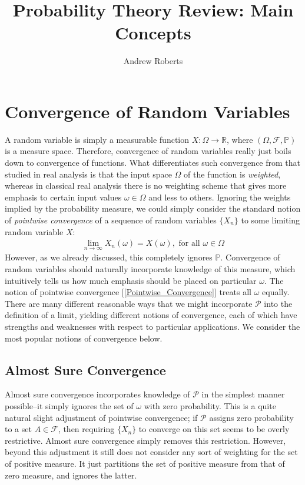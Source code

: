 \documentclass[12pt]{article}
\title{Probability Theory Review: Main Concepts}
\author{Andrew Roberts}
\newcommand{\R}{\mathbb{R}}
\begin{document}
\maketitle
\tableofcontents
\newpage

\section{Convergence of Random Variables}
A random variable is simply a measurable function $X: \Omega \to \R$, where $(\Omega, \mathcal{F}, \mathbb{P})$ is a measure space. Therefore, convergence of random variables
really just boils down to convergence of functions. What differentiates such convergence from that studied in real analysis is that the input space $\Omega$ of the function is \textit{weighted}, 
whereas in classical real analysis there is no weighting scheme that gives more emphasis to certain input values $\omega \in \Omega$ and less to others. Ignoring the weights implied by the 
probability measure, we could simply consider the standard notion of \textit{pointwise convergence} of a sequence of random variables $\{X_n\}$ to some limiting random variable $X$:
\begin{align}
\lim_{n \to \infty} X_n(\omega) = X(\omega), \text{ for all } \omega \in \Omega \label{Pointwise_Convergence}
\end{align}
However, as we already discussed, this completely ignores $\mathbb{P}$. Convergence of random variables should naturally incorporate knowledge of this measure, which intuitively tells us 
how much emphasis should be placed on particular $\omega$. The notion of pointwise convergence [\ref{Pointwise_Convergence}] treats all $\omega$ equally. There are many different reasonable
ways that we might incorporate $\mathcal{P}$ into the definition of a limit, yielding different notions of convergence, each of which have strengths and weaknesses with respect to particular applications. 
We consider the most popular notions of convergence below. 

\subsection{Almost Sure Convergence}
Almost sure convergence incorporates knowledge of $\mathcal{P}$ in the simplest manner possible--it simply ignores the set of $\omega$ with zero probability. This is a quite natural slight adjustment 
of pointwise convergence; if $\mathcal{P}$ assigns zero probability to a set $A \in \mathcal{F}$, then requiring $\{X_n\}$ to converge on this set seems to be overly restrictive. Almost sure convergence 
simply removes this restriction. However, beyond this adjustment it still does not consider any sort of weighting for the set of positive measure. It just partitions the set of positive measure from that of zero 
measure, and ignores the latter. 
\end{document}

